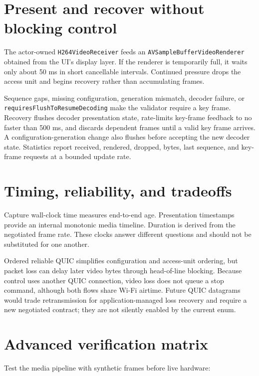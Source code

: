 \documentclass[10pt,openany]{book}
\begin{document}
\section{Present and recover without blocking control}

The actor-owned \texttt{H264VideoReceiver} feeds an \texttt{AVSampleBufferVideoRenderer} obtained from the UI's display layer. If the renderer is temporarily full, it waits only about 50 ms in short cancellable intervals. Continued pressure drops the access unit and begins recovery rather than accumulating frames.

Sequence gaps, missing configuration, generation mismatch, decoder failure, or \texttt{requiresFlushToResumeDecoding} make the validator require a key frame. Recovery flushes decoder presentation state, rate-limits key-frame feedback to no faster than 500 ms, and discards dependent frames until a valid key frame arrives. A configuration-generation change also flushes before accepting the new decoder state. Statistics report received, rendered, dropped, bytes, last sequence, and key-frame requests at a bounded update rate.

\section*{Timing, reliability, and tradeoffs}

Capture wall-clock time measures end-to-end age. Presentation timestamps provide an internal monotonic media timeline. Duration is derived from the negotiated frame rate. These clocks answer different questions and should not be substituted for one another.

Ordered reliable QUIC simplifies configuration and access-unit ordering, but packet loss can delay later video bytes through head-of-line blocking. Because control uses another QUIC connection, video loss does not queue a stop command, although both flows share Wi-Fi airtime. Future QUIC datagrams would trade retransmission for application-managed loss recovery and require a new negotiated contract; they are not silently enabled by the current enum.

\section{Advanced verification matrix}

Test the media pipeline with synthetic frames before live hardware:
\end{document}
